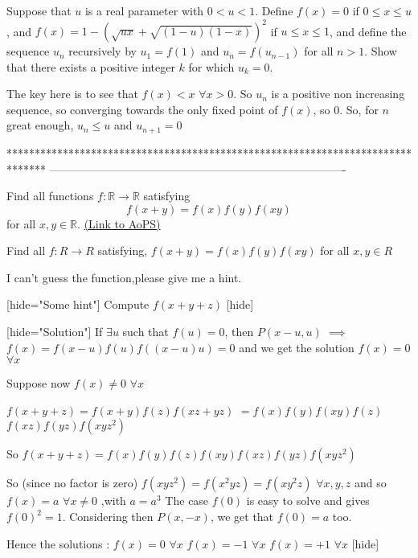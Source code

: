 \begin{solution}
	\begin{tcolorbox}Suppose that $ u$ is a real parameter with $ 0 < u < 1$. Define $ f(x) = 0$ if $ 0 \le x \le u$, and $ f(x) = 1 - (\sqrt {ux} + \sqrt {(1 - u)(1 - x)})^2$ if $ u \le x \le 1$, and define the sequence $ u_n$ recursively by $ u_1 = f(1)$ and $ u_n = f(u_{n - 1})$ for all $ n > 1$. Show that there exists a positive integer $ k$ for which $ u_k = 0$.\end{tcolorbox}

The key here is to see that $ f(x)<x$ $ \forall x>0$. So $ u_n$ is a positive non increasing sequence, so converging towards the only fixed point of $ f(x)$, so $ 0$. 
So, for $ n$ great enough, $ u_n\leq u$ and $ u_{n+1}=0$
\end{solution}
*******************************************************************************
-------------------------------------------------------------------------------

\begin{problem}
	Find all functions $f: \mathbb R \to \mathbb R$ satisfying
\[ f(x+y)=f(x)f(y)f(xy)\] for all $ x,y\in \mathbb R$.
	\flushright \href{https://artofproblemsolving.com/community/c6h285206}{(Link to AoPS)}
\end{problem}



\begin{solution}
	\begin{tcolorbox}Find all $ f: R\rightarrow R$ satisfying, 
$ f(x + y) = f(x)f(y)f(xy)$ for all $ x,y\in R$

I can't guess the function,please give me a hint.\end{tcolorbox}

[hide="Some hint"]
Compute $ f(x + y + z)$
[\/hide]

[hide="Solution"]
If $ \exists u$ such that $ f(u) = 0$, then $ P(x - u,u)$ $ \implies$ $ f(x) = f(x - u)f(u)f((x - u)u) = 0$ and we get the solution $ f(x) = 0$ $ \forall x$

Suppose now $ f(x)\neq 0$ $ \forall x$

$ f(x + y + z) = f(x + y)f(z)f(xz + yz)$ $ = f(x)f(y)f(xy)f(z)$ $ f(xz)f(yz)f(xyz^2)$

So $ f(x + y + z) = f(x)f(y)f(z)f(xy)f(xz)f(yz)f(xyz^2)$

So (since no factor is zero) $ f(xyz^2) = f(x^2yz) = f(xy^2z)$ $ \forall x,y,z$ and so $ f(x) = a$ $ \forall x\neq 0$ ,with $ a = a^3$
The case $ f(0)$ is easy to solve and gives $ f(0)^2 = 1$. Considering then $ P(x,-x)$, we get that $ f(0)=a$ too.

Hence the solutions :
$ f(x) = 0$ $ \forall x$
$ f(x) = - 1$ $ \forall x$
$ f(x) = + 1$ $ \forall x$
[\/hide]
\end{solution}



